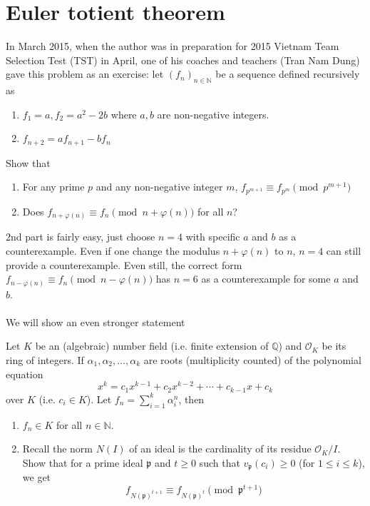 \documentclass{treatise}
\begin{document}
\section{Euler totient theorem}
In March 2015, when the author was in preparation for 2015 Vietnam Team Selection Test (TST) in April, one of his coaches and teachers (Tran Nam Dung) gave this problem as an exercise: let $(f_n)_{n \in \mathbb{N}}$ be a sequence defined recursively as
\begin{enumerate}
	\item $f_1 = a, f_2 = a^2 - 2b$ where $a, b$ are non-negative integers.
	\item $f_{n + 2} = a f_{n + 1} - b f_n$
\end{enumerate}
Show that
\begin{enumerate}
	\item For any prime $p$ and any non-negative integer $m$, $f_{p^{m + 1}} \equiv f_{p^m} \pmod{p^{m + 1}}$
	\item Does $f_{n + \varphi(n)} \equiv f_n \pmod{n + \varphi(n)}$ for all $n$?
\end{enumerate}
2nd part is fairly easy, just choose $n = 4$ with specific $a$ and $b$ as a counterexample. Even if one change the modulus $n + \varphi(n)$ to $n$, $n = 4$ can still provide a counterexample. Even still, the correct form $f_{n - \varphi(n)} \equiv f_n \pmod{n - \varphi(n)}$ has $n = 6$ as a counterexample for some $a$ and $b$.
\\
\\
We will show an even stronger statement
\begin{theorem} \label{sum-eul-totient}
Let $K$ be an (algebraic) number field (i.e. finite extension of $\mathbb{Q}$) and $\mathcal{O}_K$ be its ring of integers. If $\alpha_1, \alpha_2, \hdots, \alpha_k$ are roots (multiplicity counted) of the polynomial equation
$$x^k = c_1 x^{k - 1} + c_2 x^{k - 2} + \cdots + c_{k - 1} x + c_k$$
over $K$ (i.e. $c_i \in K$). Let $f_n = \sum_{i = 1}^k \alpha_i^n$, then
\begin{enumerate}
	\item  $f_n \in K$ for all $n \in \mathbb{N}$.
	\item Recall the norm $N(I)$ of an ideal is the cardinality of its residue $\mathcal{O}_K / I$. Show that for a prime ideal $\mathfrak{p}$ and $t \geq 0$ such that $v_\mathfrak{p} (c_i) \geq 0$ (for $1 \leq i \leq k$), we get
	$$f_{N(\mathfrak{p})^{t + 1}} \equiv f_{N(\mathfrak{p})^t} \pmod{\mathfrak{p}^{t + 1}}$$
\end{enumerate}
\end{theorem}
\end{document}
